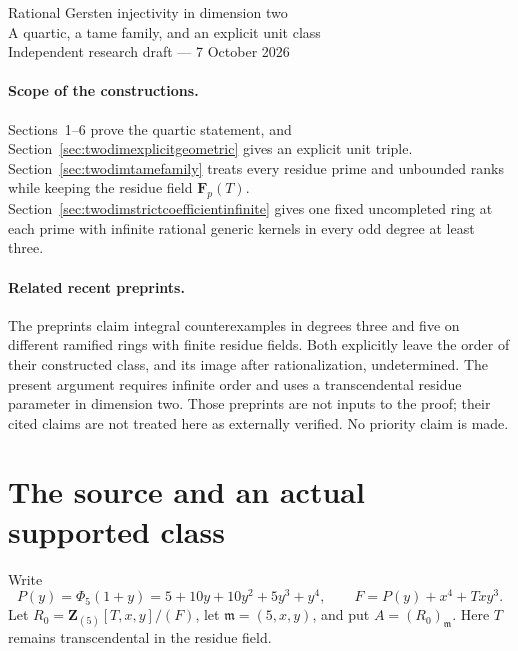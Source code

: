 \documentclass[11pt,a4paper]{article}
\theoremstyle{remark}
\newcommand{\Z}{\mathbf Z}
\newcommand{\F}{\mathbf F}
\begin{document}
\begin{center}
{\Large Rational Gersten injectivity in dimension two}\\[5pt]
{\normalsize A quartic, a tame family, and an explicit unit class}\\[6pt]
{\small Independent research draft --- 7 October 2026}
\end{center}
\noindent{}

\paragraph{Scope of the constructions.}
Sections~1--6 prove the quartic statement, and
Section~\ref{sec:twodimexplicitgeometric} gives an explicit unit triple.
Section~\ref{sec:twodimtamefamily} treats every residue prime and
unbounded ranks while keeping the residue field $\F_p(T)$.
Section~\ref{sec:twodimstrictcoefficientinfinite} gives one fixed
uncompleted ring at each prime with infinite rational generic kernels
in every odd degree at least three.

\paragraph{Related recent preprints.}
The preprints \cite{PriorIntegralK3,PriorIntegralK5} claim integral
counterexamples in degrees three and five on different ramified
rings with finite residue fields. Both explicitly leave the order
of their constructed class, and its image after rationalization,
undetermined. The present argument requires infinite order and
uses a transcendental residue parameter in dimension two. Those
preprints are not inputs to the proof; their cited claims are not
treated here as externally verified. No priority claim is made.

\section{The source and an actual supported class}

Write
\[
 P(y)=\Phi_5(1+y)=5+10y+10y^2+5y^3+y^4,
 \qquad F=P(y)+x^4+Txy^3.
\]
Let $R_0=\Z_{(5)}[T,x,y]/(F)$, let
$\mathfrak m=(5,x,y)$, and put $A=(R_0)_{\mathfrak m}$.
Here $T$ remains transcendental in the residue field.
\end{document}
